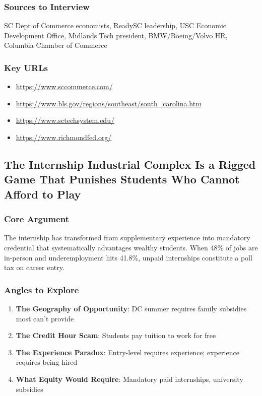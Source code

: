 \documentclass[11pt,letterpaper]{article}
\begin{document}
\subsubsection*{Sources to Interview}
SC Dept of Commerce economists, ReadySC leadership, USC Economic Development Office, Midlands Tech president, BMW/Boeing/Volvo HR, Columbia Chamber of Commerce

\subsubsection*{Key URLs}
\begin{itemize}[noitemsep]
    \item \url{https://www.sccommerce.com/}
    \item \url{https://www.bls.gov/regions/southeast/south_carolina.htm}
    \item \url{https://www.sctechsystem.edu/}
    \item \url{https://www.richmondfed.org/}
\end{itemize}

\newpage
\subsection{The Internship Industrial Complex Is a Rigged Game That Punishes Students Who Cannot Afford to Play}

\subsubsection*{Core Argument}
The internship has transformed from supplementary experience into mandatory credential that systematically advantages wealthy students. When 48\% of jobs are in-person and underemployment hits 41.8\%, unpaid internships constitute a poll tax on career entry.

\subsubsection*{Angles to Explore}
\begin{enumerate}[noitemsep]
    \item \textbf{The Geography of Opportunity}: DC summer requires family subsidies most can't provide
    \item \textbf{The Credit Hour Scam}: Students pay tuition to work for free
    \item \textbf{The Experience Paradox}: Entry-level requires experience; experience requires being hired
    \item \textbf{What Equity Would Require}: Mandatory paid internships, university subsidies
\end{enumerate}
\end{document}
